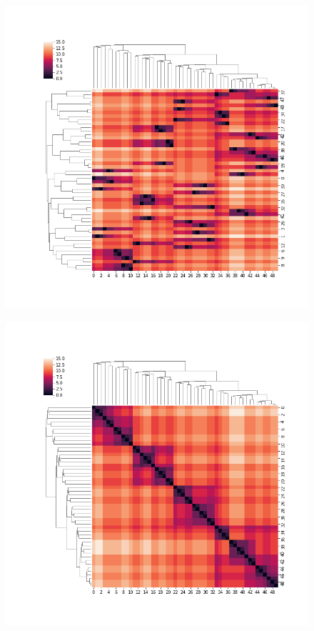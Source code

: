 \documentclass[12pt]{article}
\begin{document}
\begin{figure}
\begin{minipage}[c]{0.49\textwidth}
{	}
\end{minipage}
\begin{minipage}[c]{0.49\textwidth}
 	 {
	  \includegraphics[width=\textwidth]{plots/jet70TrueHeatMap_orderkt.png}
	}
\end{minipage}
\begin{minipage}[c]{0.49\textwidth}
 	 {
	  \includegraphics[width=\textwidth]{plots/jet70TrueHeatMap_orderTruth.png}
}
\end{minipage}
\end{figure}
\end{document}
